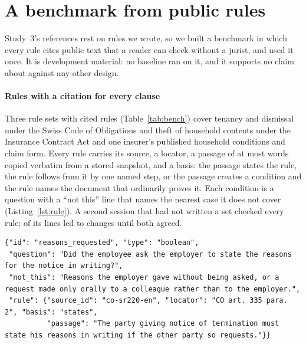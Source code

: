 \section{A benchmark from public rules}
\label{sec:benchmark}

Study~3's references rest on rules we wrote, so we built a benchmark in which every rule cites public text that a reader can check without a jurist, and used it once. It is development material: no baseline ran on it, and it supports no claim about \casepath against any other design.

\paragraph{Rules with a citation for every clause}
Three rule sets with \sfourdevAllRules{} cited rules (Table~\ref{tab:bench}) cover tenancy and dismissal under the Swiss Code of Obligations and theft of household contents under the Insurance Contract Act and one insurer's published household conditions and claim form.
Every rule carries its source, a locator, a passage of at most \sfourdevPassageMaxWords{} words copied verbatim from a stored snapshot, and a basis: the passage states the rule, the rule follows from it by one named step, or the passage creates a condition and the rule names the document that ordinarily proves it. Each condition is a question with a ``not this'' line that names the nearest case it does not cover (Listing~\ref{lst:rule}). A second session that had not written a set checked every rule; \sfourdevAllCheckNotAgree{} of its \sfourdevAllCheckLines{} lines led to changes until both agreed.

\begin{lstlisting}[float=t,caption={A condition of the dismissal rule set as stored in \texttt{rules.json} (keys reordered; the German passage left out).},label=lst:rule]
{"id": "reasons_requested", "type": "boolean",
 "question": "Did the employee ask the employer to state the reasons for the notice in writing?",
 "not_this": "Reasons the employer gave without being asked, or a request made only orally to a colleague rather than to the employer.",
 "rule": {"source_id": "co-sr220-en", "locator": "CO art. 335 para. 2", "basis": "states",
          "passage": "The party giving notice of termination must state his reasons in writing if the other party so requests."}}
\end{lstlisting}

